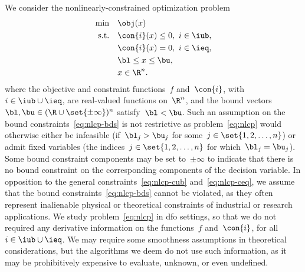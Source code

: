 We consider the nonlinearly-constrained optimization problem
\begin{subequations}
    \label{eq:nlcp}
    \begin{align}
        \min        & \quad \obj(x) \label{eq:nlcp-obj}\\
        \text{s.t.} & \quad \con{i}(x) \le 0, ~ i \in \iub, \label{eq:nlcp-cub}\\
                    & \quad \con{i}(x) = 0, ~ i \in \ieq, \label{eq:nlcp-ceq}\\
                    & \quad \bl \le x \le \bu, \label{eq:nlcp-bds}\\
                    & \quad x \in \R^n. \nonumber
    \end{align}
\end{subequations}
%
%
%
%
where the objective and constraint functions~$f$ and~$\con{i}$, with~$i \in \iub \cup \ieq$, are real-valued functions on~$\R^n$, and the bound vectors~$\bl, \bu \in (\R \cup \set{\pm \infty})^n$ satisfy~$\bl < \bu$.
Such an assumption on the bound constraints~\eqref{eq:nlcp-bds} is not restrictive as problem~\eqref{eq:nlcp} would otherwise either be infeasible (if~$\bl_j > \bu_j$ for some~$j \in \set{1, 2, \dots, n}$) or admit fixed variables (the indices~$j \in \set{1, 2, \dots, n}$ for which~$\bl_j = \bu_j$).
Some bound constraint components may be set to~$\pm \infty$ to indicate that there is no bound constraint on the corresponding components of the decision variable.
In opposition to the general constraints~\eqref{eq:nlcp-cub} and~\eqref{eq:nlcp-ceq}, we assume that the bound constraints~\eqref{eq:nlcp-bds} cannot be violated, as they often represent inalienable physical or theoretical constraints of industrial or research applications.
We study problem~\eqref{eq:nlcp} in \gls{dfo} settings, so that we do not required any derivative information on the functions~$f$ and~$\con{i}$, for all~$i \in \iub \cup \ieq$.
We may require some smoothness assumptions in theoretical considerations, but the algorithms we deem do not use such information, as it may be prohibitively expensive to evaluate, unknown, or even undefined.

